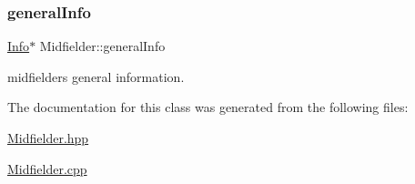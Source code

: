 \subsubsection{\texorpdfstring{general\+Info}{generalInfo}}
{\footnotesize\ttfamily \hyperlink{class_info}{Info}$\ast$ Midfielder\+::general\+Info\hspace{0.3cm}{\ttfamily [private]}}



midfielder\textquotesingle{}s general information. 



The documentation for this class was generated from the following files\+:\begin{DoxyCompactItemize}
\item 
\hyperlink{_midfielder_8hpp}{Midfielder.\+hpp}\item 
\hyperlink{_midfielder_8cpp}{Midfielder.\+cpp}\end{DoxyCompactItemize}
